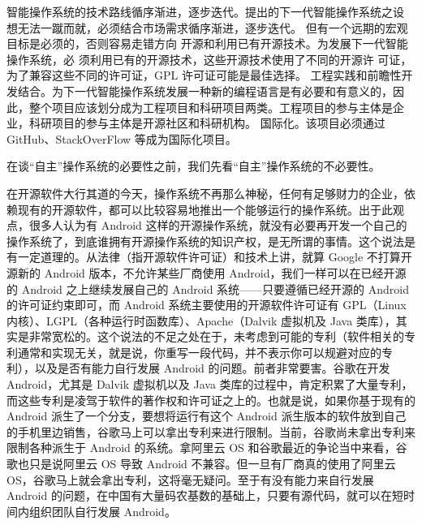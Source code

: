 \documentclass[cs4size,a4paper,nofonts]{ctexart}
\begin{document}
智能操作系统的技术路线循序渐进，逐步迭代。提出的下一代智能操作系统之设
想无法一蹴而就，必须结合市场需求循序渐进，逐步迭代。
但有一个远期的宏观目标是必须的，否则容易走错方向
开源和利用已有开源技术。为发展下一代智能操作系统，必
须利用已有的开源技术，这些开源技术使用了不同的开源许
可证，为了兼容这些不同的许可证，GPL 许可证可能是最佳选择。
工程实践和前瞻性开发结合。为下一代智能操作系统发展一种新的编程语言是有必要和有意义的，因此，整个项目应该划分成为工程项目和科研项目两类。工程项目的参与主体是企业，科研项目的参与主体是开源社区和科研机构。
国际化。该项目必须通过 GitHub、StackOverFlow 等成为国际化项目。


在谈“自主”操作系统的必要性之前，我们先看“自主”操作系统的不必要性。

在开源软件大行其道的今天，操作系统不再那么神秘，任何有足够财力的企业，依赖现有的开源软件，都可以比较容易地推出一个能够运行的操作系统。出于此观点，很多人认为有 Android 这样的开源操作系统，就没有必要再开发一个自己的操作系统了，到底谁拥有开源操作系统的知识产权，是无所谓的事情。这个说法是有一定道理的。从法律（指开源软件许可证）和技术上讲，就算 Google 不打算开源新的 Android 版本，不允许某些厂商使用 Android，我们一样可以在已经开源的 Android 之上继续发展自己的 Android 系统——只要遵循已经开源的 Android 的许可证约束即可，而 Android 系统主要使用的开源软件许可证有 GPL（Linux 内核）、LGPL（各种运行时函数库）、Apache（Dalvik 虚拟机及 Java 类库），其实是非常宽松的。这个说法的不足之处在于，未考虑到可能的专利（软件相关的专利通常和实现无关，就是说，你重写一段代码，并不表示你可以规避对应的专利），以及是否有能力自行发展 Android 的问题。前者非常要害。谷歌在开发 Android，尤其是 Dalvik 虚拟机以及 Java 类库的过程中，肯定积累了大量专利，而这些专利是凌驾于软件的著作权和许可证之上的。也就是说，如果你基于现有的 Android 派生了一个分支，要想将运行有这个 Android 派生版本的软件放到自己的手机里边销售，谷歌马上可以拿出专利来进行限制。当前，谷歌尚未拿出专利来限制各种派生于 Android 的系统。拿阿里云 OS 和谷歌最近的争论当中来看，谷歌也只是说阿里云 OS 导致 Android 不兼容。但一旦有厂商真的使用了阿里云 OS，谷歌马上就会拿出专利，这将毫无疑问。至于有没有能力来自行发展 Android 的问题，在中国有大量码农基数的基础上，只要有源代码，就可以在短时间内组织团队自行发展 Android。
\end{document}
